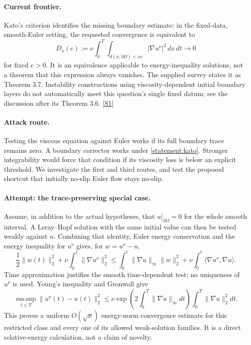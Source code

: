 \documentclass[11pt,a4paper]{article}
\newcommand{\sref}[2]{\hyperlink{source:#1:#2}{[S#2]}}
\numberwithin{equation}{section}
\begin{document}
\paragraph{Current frontier.}
Kato's criterion identifies the missing boundary estimate: in the fixed-data,
smooth-Euler setting, the requested convergence is equivalent to
\begin{equation}\label{statement:kato}
 D_\nu(c):=\nu\int_0^T\int_{d(x,\partial\Omega)<c\nu}
                       |\nabla u^\nu|^2\,dx\,dt\longrightarrow0
\end{equation}
for fixed $c>0$. It is an equivalence applicable to energy-inequality
solutions, not a theorem that this expression always vanishes. The supplied
survey states it as Theorem 3.7. Instability constructions using
viscosity-dependent initial boundary layers do not automatically meet this
question's single fixed datum; see the discussion after its Theorem 3.6.
\sref{statement}{1}

\paragraph{Attack route.}
Testing the viscous equation against Euler works if its full boundary trace
remains zero. A boundary corrector works under \eqref{statement:kato}. Stronger
integrability would force that condition if its viscosity loss is below an
explicit threshold. We investigate the first and third routes, and test the
proposed shortcut that initially no-slip Euler flow stays no-slip.

\paragraph{Attempt: the trace-preserving special case.}
Assume, in addition to the actual hypotheses, that
$u|_{\partial\Omega}=0$ for the whole smooth interval. A Leray--Hopf solution
with the same initial value can then be tested weakly against $u$.
Combining that identity, Euler energy conservation and the energy inequality
for $u^\nu$ gives, for $w=u^\nu-u$,
\[
 \frac12\|w(t)\|_2^2+\nu\int_0^t\|\nabla u^\nu\|_2^2
 \le\int_0^t\|\nabla u\|_\infty\|w\|_2^2
   +\nu\int_0^t\langle\nabla u^\nu,\nabla u\rangle.
\]
Time approximation justifies the smooth time-dependent test; no uniqueness
of $u^\nu$ is used. Young's inequality and Gronwall give
\begin{equation}\label{statement:trace}
 \operatorname*{ess\,sup}_{t\le T}\|u^\nu(t)-u(t)\|_2^2
 \le\nu\exp\!\left(2\int_0^T\|\nabla u\|_\infty dt\right)
                  \int_0^T\|\nabla u\|_2^2dt.
\end{equation}
This proves a uniform $O(\sqrt\nu)$ energy-norm convergence estimate for
this restricted class and every one of its allowed weak-solution families.
It is a direct relative-energy calculation, not a claim of novelty.
\end{document}
